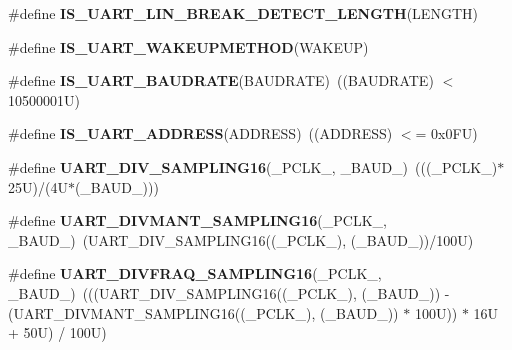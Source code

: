 \begin{DoxyCompactItemize}
\item 
\#define {\bfseries I\+S\+\_\+\+U\+A\+R\+T\+\_\+\+L\+I\+N\+\_\+\+B\+R\+E\+A\+K\+\_\+\+D\+E\+T\+E\+C\+T\+\_\+\+L\+E\+N\+G\+TH}(L\+E\+N\+G\+TH)
\item 
\#define {\bfseries I\+S\+\_\+\+U\+A\+R\+T\+\_\+\+W\+A\+K\+E\+U\+P\+M\+E\+T\+H\+OD}(W\+A\+K\+E\+UP)
\item 
\mbox{\label{group___u_a_r_t___private___macros_ga5d657d5c8e47b147a834e0018e9407c2}} 
\#define {\bfseries I\+S\+\_\+\+U\+A\+R\+T\+\_\+\+B\+A\+U\+D\+R\+A\+TE}(B\+A\+U\+D\+R\+A\+TE)~((B\+A\+U\+D\+R\+A\+TE) $<$ 10500001\+U)
\item 
\mbox{\label{group___u_a_r_t___private___macros_ga2c4dce8c60f202455e6f1481fc441f98}} 
\#define {\bfseries I\+S\+\_\+\+U\+A\+R\+T\+\_\+\+A\+D\+D\+R\+E\+SS}(A\+D\+D\+R\+E\+SS)~((A\+D\+D\+R\+E\+SS) $<$= 0x0\+F\+U)
\item 
\mbox{\label{group___u_a_r_t___private___macros_gabd6dd99fff6cd5c0374780fd72a61e6e}} 
\#define {\bfseries U\+A\+R\+T\+\_\+\+D\+I\+V\+\_\+\+S\+A\+M\+P\+L\+I\+N\+G16}(\+\_\+\+P\+C\+L\+K\+\_\+,  \+\_\+\+B\+A\+U\+D\+\_\+)~(((\+\_\+\+P\+C\+L\+K\+\_\+)$\ast$25\+U)/(4\+U$\ast$(\+\_\+\+B\+A\+U\+D\+\_\+)))
\item 
\mbox{\label{group___u_a_r_t___private___macros_ga9cd479aff25c454d9d4f3c1c20517c86}} 
\#define {\bfseries U\+A\+R\+T\+\_\+\+D\+I\+V\+M\+A\+N\+T\+\_\+\+S\+A\+M\+P\+L\+I\+N\+G16}(\+\_\+\+P\+C\+L\+K\+\_\+,  \+\_\+\+B\+A\+U\+D\+\_\+)~(U\+A\+R\+T\+\_\+\+D\+I\+V\+\_\+\+S\+A\+M\+P\+L\+I\+N\+G16((\+\_\+\+P\+C\+L\+K\+\_\+), (\+\_\+\+B\+A\+U\+D\+\_\+))/100\+U)
\item 
\mbox{\label{group___u_a_r_t___private___macros_gade99ebfd7502df11b366c48fac5417d7}} 
\#define {\bfseries U\+A\+R\+T\+\_\+\+D\+I\+V\+F\+R\+A\+Q\+\_\+\+S\+A\+M\+P\+L\+I\+N\+G16}(\+\_\+\+P\+C\+L\+K\+\_\+,  \+\_\+\+B\+A\+U\+D\+\_\+)~(((U\+A\+R\+T\+\_\+\+D\+I\+V\+\_\+\+S\+A\+M\+P\+L\+I\+N\+G16((\+\_\+\+P\+C\+L\+K\+\_\+), (\+\_\+\+B\+A\+U\+D\+\_\+)) -\/ (U\+A\+R\+T\+\_\+\+D\+I\+V\+M\+A\+N\+T\+\_\+\+S\+A\+M\+P\+L\+I\+N\+G16((\+\_\+\+P\+C\+L\+K\+\_\+), (\+\_\+\+B\+A\+U\+D\+\_\+)) $\ast$ 100\+U)) $\ast$ 16\+U + 50\+U) / 100\+U)
\item 

\end{DoxyCompactItemize}

